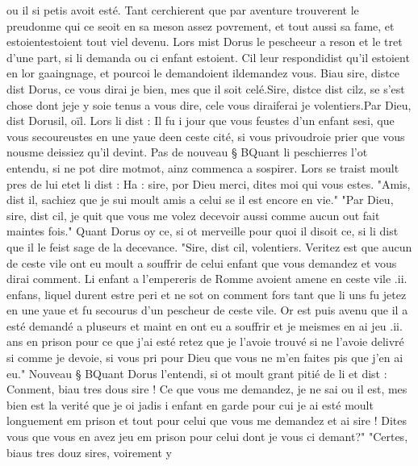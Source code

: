\documentclass{article}
\begin{document}
\begin{pages}
   ou il si petis avoit esté. Tant cerchierent que par aventure trouverent le preudonme 
   qui ce seoit en sa meson assez povrement, et tout aussi sa fame, et 
   estoientestoient tout viel 
   devenu. 
   Lors mist Dorus le pescheeur a reson et le tret d’une part, 
   si li demanda ou ci enfant estoient. Cil 
   leur respondidist 
   qu’il estoient en lor gaaingnage, et pourcoi le 
      demandoient ildemandez vous.
   Biau sire, 
      distce dist Dorus, 
      ce vous dirai je bien, mes que il soit celé.Sire, distce dist cilz, 
      se s’est chose dont jeje y soie tenus 
      a vous dire, 
      cele vous 
      diraiferai 
      je volentiers.Par Dieu, 
      dist Dorusil, oïl.
   Lors li dist :
   Il fu i jour que vous feustes d’un enfant sesi,
      que vous secoureustes en une yaue deen 
      ceste cité, 
      si vous privoudroie prier que vous 
      nousme deissiez qu’il devint. \pend
\pstart Pas de nouveau § BQuant li peschierres l’ot entendu, 
   si ne pot dire motmot, ainz commenca a sospirer. Lors se traist moult pres de lui 
   etet li dist : 
      Ha : sire, por Dieu merci, dites moi qui vous estes.
      "Amis, dist il, sachiez que je sui moult amis a celui se il est encore en vie." 
      "Par Dieu, sire, dist cil, je quit que vous me volez decevoir aussi comme aucun out fait maintes fois." 
      Quant Dorus oy ce, si ot merveille pour quoi il disoit ce, si li dist que il le feist sage de la decevance. 
      "Sire, dist cil, volentiers. Veritez est que aucun de ceste vile ont eu moult a souffrir de celui enfant que 
      vous demandez et vous dirai comment. Li enfant a l'empereris de Romme avoient amene en ceste vile .ii. enfans, liquel durent estre
      peri et ne sot on comment fors tant que li uns fu jetez en une yaue et fu secourus d'un pescheur de ceste vile. Or est puis avenu que 
      il a esté demandé a pluseurs et maint en ont eu a souffrir et je meismes en ai jeu .ii. ans en prison pour ce que j'ai esté retez que 
      je l'avoie trouvé si ne l'avoie delivré si comme je devoie, si vous pri pour Dieu que vous ne m'en faites pis que j'en ai eu." 
      Nouveau § BQuant Dorus l'entendi, si ot moult grant pitié de li et dist :
   Conment, biau tres dous sire ! Ce que vous me demandez, je ne sai ou il est, 
      mes bien est la verité que je oi jadis i enfant en garde pour cui je ai esté moult longuement em prison 
      et tout pour celui que vous me demandez et ai
      sire ! Dites vous que vous en avez jeu em prison pour celui dont je vous 
         ci 
         demant?" "Certes, biaus tres douz sires, voirement y 

\end{pages}
\end{document}
